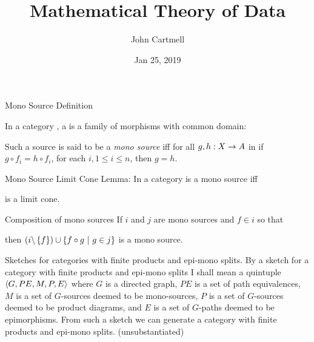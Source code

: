 \documentclass[xcolor=pst,dvips]{beamer}
\title[John Cartmell]{Mathematical Theory of Data}
\author{John Cartmell}
\institute{ad otium}
\date{Jan 25, 2019}
\begin{document}
\section{\MToDsection}
\subsection{\MToDsubsectionliteraturewithProductsandEpiMonosCategories}

\begin{frame}{Mono Source Definition} %
\begin{definition}
In a category , a   is a family of morphisms with common domain: \\
\begin{center}
\scalebox{0.65}{

} 
\end{center}
\medskip
Such a source is said to be a \textit{mono source} iff for all $g,h:X \rightarrow A$ in  if $g \circ f_i = h \circ f_i$, for each $i, 1 \leq i \leq n$, then $g=h$.
\end{definition}
\end{frame}

\begin{frame}{Mono Source Limit Cone}  %
Lemma: In a category 
\scalebox{0.65}{

} is a mono source iff \\
\begin{center}
\scalebox{0.65}{

} 
is a limit cone.
\end{center}
\end{frame}


\begin{frame}{Composition of mono sources}
If $i$ and $j$ are mono sources and $f \in i$ so that
\begin{center}
\scalebox{0.65}{

}
\end{center}
then $(i \backslash \left\{f\right\}) \cup \left\{f \circ g \ \middle|\ g \in j\right\}$ is a mono source.
\end{frame}

\begin{frame}{Sketches for categories with finite products and epi-mono splits.}
By a sketch for a category with finite products and epi-mono splits I shall mean a quintuple
$\langle G,PE,M,P,E\rangle$
 where $G$ is a directed graph, 
$PE$ is a set of path equivalences, 
$M$ is a set of $G$-sources deemed to be mono-sources,
$P$ is a set of $G$-sources deemed to be product diagrams, 
and $E$ is a set of $G$-paths deemed to be epimorphisms.
\medskip
From such a sketch we can generate a category with finite products and epi-mono splits.  (unsubstantiated)   
\end{frame}
\end{document}
